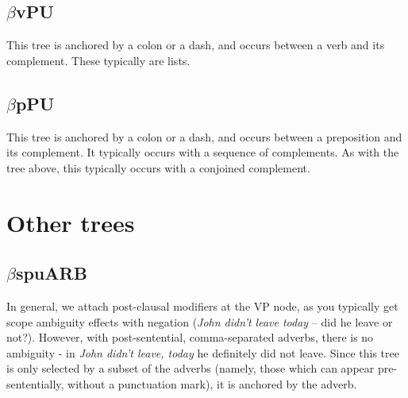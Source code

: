 \subsection{$\beta$vPU}


This tree is anchored by a colon or a dash, and occurs between a verb
and its complement. These typically are lists.


\subsection{$\beta$pPU}

This tree is anchored by a colon or a dash, and occurs between a
preposition and its complement. It typically occurs with a sequence
of complements. As with the tree above, this typically occurs with a
conjoined complement.


\section{Other trees}

\subsection{$\beta$spuARB}
\label{post-adverb}

In general, we attach post-clausal modifiers at the VP node, as you
typically get scope ambiguity effects with negation ({\it John didn't
leave today} -- did he leave or not?). However, with post-sentential,
comma-separated adverbs, there is no ambiguity - in {\it John didn't
leave, today} he definitely did not leave. Since this tree is only
selected by a subset of the adverbs (namely, those which can appear
pre-sententially, without a punctuation mark), it is anchored by the
adverb.



